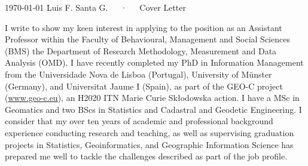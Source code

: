 \documentclass[11pt, a4paper]{awesome-cv}
\begin{document}
\makecvheader[R]

\makecvfooter
  {\today}
    {Luis F. Santa G.~~~·~~~Cover Letter}
  {}

\makelettertitle

\begin{cvletter}
I write to show my keen interest in applying to the position as an Assistant Professor within the Faculty of Behavioural, Management and Social Sciences (BMS) the Department of Research Methodology, Measurement and Data Analysis (OMD). I have recently completed my PhD in Information Management from the Universidade Nova de Lisboa (Portugal), University of Münster (Germany), and Universitat Jaume I (Spain), as part of the GEO-C project (\url{www.geo-c.eu}), an H2020 ITN Marie Curie Skłodowska action. I have a MSc in Geomatics and two BScs in Statistics and Cadastral and Geodetic Engineering. I consider that my over ten years of academic and professional background experience conducting research and teaching, as well as supervising graduation projects in Statistics, Geoinformatics, and Geographic Information Science has prepared me well to tackle the challenges described as part of the job profile.\par

\end{cvletter}
\end{document}
